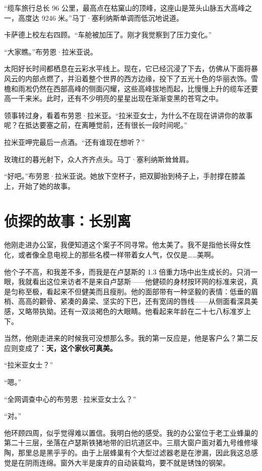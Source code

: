 \documentclass[AutoFakeBold=true]{book}
\begin{document}
``缆车旅行总长 96 公里，最高点在枯窠山的顶峰，这座山是笼头山脉五大高峰之一，高度达 9246 米。''马丁·塞利纳斯单调而低沉地说道。

卡萨德上校左右四顾。``车舱被加压了。刚才我觉察到了压力变化。''

``大家瞧。''布劳恩·拉米亚说。

太阳好长时间都栖息在云彩水平线上。现在，它已经沉浸了下去，仿佛从下面将暴风云的内部点燃了，并沿着整个世界的西方边缘，投下了五光十色的华丽衣饰。雪檐和雨凇仍然在西部高峰的侧面闪耀，这些高峰拔地而起，比慢慢上升的缆车还要高一千来米。此时，还有不少明亮的星星出现在渐渐变黑的苍穹之中。

领事转过身，看着布劳恩·拉米亚。``拉米亚女士，为什么不在现在讲讲你的故事呢？在抵达要塞之前，在离睡觉前，还有很长一段时间呢。''

拉米亚呷完最后一点酒。``还有谁现在想听？''

玫瑰红的暮光射下，众人齐齐点头。马丁·塞利纳斯耸耸肩。

``好吧。''布劳恩·拉米亚说。她放下空杯子，把双脚抬到椅子上，手肘撑在膝盖上，开始了她的故事。

\section{侦探的故事：长别离}

他刚走进办公室，我便知道这个案子不同寻常。他太美了。我不是指他长得女性化，或者像全息电视上的那些名模一样带着女人气，仅仅是……美啊。

他个子不高，和我差不多，而我是在卢瑟斯的 1.3 倍重力场中出生成长的。只消一眼，我就看出这位来访者不是来自卢瑟斯——他健硕的身材按环网的标准来说，真是匀称至极，看起来不但健美而且瘦削。他的面部带有一种坚毅的表情：低垂的眉梢、高高的颧骨、紧凑的鼻梁、坚实的下巴，还有宽阔的唇线——从侧面看深具美感，又略带执拗。还有一双淡褐色的大眼睛。他看起来年龄在二十七八标准岁上下。

当然，他刚走进来的时候我可没想那么多。我的第一反应是，他是客户么？第二反应则变成了：{\bf \kaishu 天，这个家伙可真美。}

``拉米亚女士？''

``嗯。''

``全网调查中心的布劳恩·拉米亚女士么？''

``对。''

他环顾四周，似乎觉得难以置信。我明白他的感受。我的办公室位于老工业蜂巢的第二十三层，坐落在卢瑟斯铁猪地带的旧坑道区中。三扇大窗户面对着九号维修壕陶，那里总是黑乎乎的。由于上层蜂巢有个大型过滤器老是在渗漏，因此我这总感觉是在阴雨连绵。窗外大半是废弃的自动装载坞，要不就是锈蚀的钢架。
\end{document}
